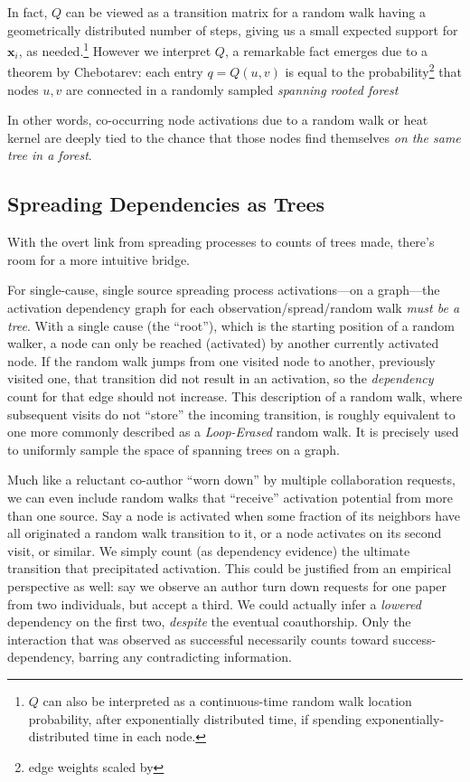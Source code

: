 \documentclass[%
	12pt,
		oneside,
		letterpaper
]{book}
\begin{document}
In fact, \(Q\) can be viewed as a transition matrix for a random walk having a geometrically distributed number of steps, giving us a small expected support for \(\mathbf{x}_i\), as needed.\footnote{\(Q\) can also be interpreted as a continuous-time random walk location probability, after exponentially distributed time, if spending exponentially-distributed time in each node.}
However we interpret \(Q\), a remarkable fact emerges due to a theorem by Chebotarev\autocite{MatrixForestTheorem_Chebotarev2006,Countingrootedforests_Knill2013}: each entry \(q=Q(u,v)\) is equal to the probability\footnote{edge weights scaled by \beta} that nodes \(u,v\) are connected in a randomly sampled \emph{spanning rooted forest}

In other words, co-occurring node activations due to a random walk or heat kernel are deeply tied to the chance that those nodes find themselves \emph{on the same tree in a forest}.

\subsection{Spreading Dependencies as Trees}\label{spreading-dependencies-as-trees}

With the overt link from spreading processes to counts of trees made, there's room for a more intuitive bridge.

For single-cause, single source spreading process activations---on a graph---the activation dependency graph for each observation/spread/random walk \emph{must be a tree}.
With a single cause (the ``root''), which is the starting position of a random walker, a node can only be reached (activated) by another currently activated node.
If the random walk jumps from one visited node to another, previously visited one, that transition did not result in an activation, so the \emph{dependency} count for that edge should not increase.
This description of a random walk, where subsequent visits do not ``store'' the incoming transition, is roughly equivalent to one more commonly described as a \emph{Loop-Erased} random walk.
It is precisely used to uniformly sample the space of spanning trees on a graph.\autocite{Generatingrandomspanning_Wilson1996}

Much like a reluctant co-author ``worn down'' by multiple collaboration requests, we can even include random walks that ``receive'' activation potential from more than one source.
Say a node is activated when some fraction of its neighbors have all originated a random walk transition to it, or a node activates on its second visit, or similar.
We simply count (as dependency evidence) the ultimate transition that precipitated activation.
This could be justified from an empirical perspective as well: say we observe an author turn down requests for one paper from two individuals, but accept a third.
We could actually infer a \emph{lowered} dependency on the first two, \emph{despite} the eventual coauthorship.
Only the interaction that was observed as successful necessarily counts toward success-dependency, barring any contradicting information.
\end{document}
